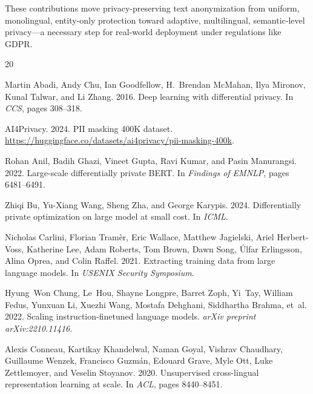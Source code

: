 \documentclass[11pt,a4paper]{article}
\begin{document}
These contributions move privacy-preserving text anonymization from
uniform, monolingual, entity-only protection toward adaptive, multilingual,
semantic-level privacy—a necessary step for real-world deployment under
regulations like GDPR.




\begin{thebibliography}{20}

Martin Abadi, Andy Chu, Ian Goodfellow, H.~Brendan McMahan, Ilya Mironov,
Kunal Talwar, and Li Zhang. 2016.
\newblock Deep learning with differential privacy.
\newblock In \emph{CCS}, pages 308--318.

AI4Privacy. 2024.
\newblock PII masking 400K dataset.
\newblock \url{https://huggingface.co/datasets/ai4privacy/pii-masking-400k}.

Rohan Anil, Badih Ghazi, Vineet Gupta, Ravi Kumar, and Pasin Manurangsi. 2022.
\newblock Large-scale differentially private BERT.
\newblock In \emph{Findings of EMNLP}, pages 6481--6491.

Zhiqi Bu, Yu-Xiang Wang, Sheng Zha, and George Karypis. 2024.
\newblock Differentially private optimization on large model at small cost.
\newblock In \emph{ICML}.

Nicholas Carlini, Florian Tram\`{e}r, Eric Wallace, Matthew Jagielski,
Ariel Herbert-Voss, Katherine Lee, Adam Roberts, Tom Brown, Dawn Song,
\'{U}lfar Erlingsson, Alina Oprea, and Colin Raffel. 2021.
\newblock Extracting training data from large language models.
\newblock In \emph{USENIX Security Symposium}.

Hyung~Won Chung, Le~Hou, Shayne Longpre, Barret Zoph, Yi~Tay, William Fedus,
Yunxuan Li, Xuezhi Wang, Mostafa Dehghani, Siddhartha Brahma, et~al. 2022.
\newblock Scaling instruction-finetuned language models.
\newblock \emph{arXiv preprint arXiv:2210.11416}.

Alexis Conneau, Kartikay Khandelwal, Naman Goyal, Vishrav Chaudhary,
Guillaume Wenzek, Francisco Guzm\'{a}n, Edouard Grave, Myle Ott,
Luke Zettlemoyer, and Veselin Stoyanov. 2020.
\newblock Unsupervised cross-lingual representation learning at scale.
\newblock In \emph{ACL}, pages 8440--8451.


\end{thebibliography}
\end{document}
